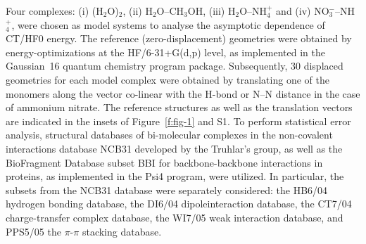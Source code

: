 Four complexes: 
(i) (H$_2$O)$_2$, 
(ii) H$_2$O--CH$_3$OH, 
(iii) H$_2$O--NH$_4^+$ and 
(iv) NO$_3^-$--NH$_4^+$,
were chosen as model systems to analyse the asymptotic dependence 
of CT/HF0 energy. 
The reference (zero\hyp{}displacement) geometries
were obtained by
energy\hyp{}optimizations at the HF/6-31+G(d,p) level,
as implemented in 
the {\sc Gaussian~16} quantum chemistry program package.\cite{Gaussian16}
Subsequently, 30 displaced geometries for each model complex
were obtained by translating one of the monomers along the vector 
co\hyp{}linear with the H-bond or N--N distance in the case of ammonium nitrate.
The reference structures as well as the translation vectors are
indicated in the insets of Figure~\ref{f:fig-1} and S1.
To perform statistical error analysis, structural databases
of bi\hyp{}molecular complexes in the non\hyp{}covalent
interactions database NCB31 developed by the Truhlar's 
group,\cite{Zhao.Schultz.Truhlar.JCTC.2006,
Zhao.Truhlar.JCTC.2005,Zhao.Schultz.Truhlar.JCTC.2006,Zhao.Schultz.Truhlar.JCP.2005}
as well as the BioFragment Database subset BBI for backbone\hyp{}backbone
interactions in proteins,\cite{Burns.Faver.Zheng.Marshall.Smith.Vanommeslaeghe.MacKerell.Merz.Sherrill.JCP.2017} 
as implemented in the {\sc Psi4}
program,\cite{Psi4.JCTC.2017}
were utilized.
In particular, the subsets from the NCB31 database were separately considered:
the HB6/04 hydrogen bonding database,\cite{Zhao.Truhlar.JCTC.2005,Zhao.Schultz.Truhlar.JCTC.2006,Zhao.Schultz.Truhlar.JCP.2005}
the DI6/04 dipoleinteraction database,\cite{Zhao.Truhlar.JCTC.2005,Zhao.Schultz.Truhlar.JCTC.2006,Zhao.Schultz.Truhlar.JCP.2005}
the CT7/04 charge-transfer complex database,\cite{Zhao.Truhlar.JCTC.2005,Zhao.Schultz.Truhlar.JCTC.2006,Zhao.Schultz.Truhlar.JCP.2005}
the WI7/05 weak interaction database,\cite{Zhao.Schultz.Truhlar.JCTC.2006,Zhao.Schultz.Truhlar.JCP.2005,Zhao.Truhlar.JPCA.2005}
and PPS5/05 the $\pi$-$\pi$ stacking database.\cite{Zhao.Schultz.Truhlar.JCTC.2006,Zhao.Schultz.Truhlar.JCP.2005,Zhao.Truhlar.JPCA.2005}

